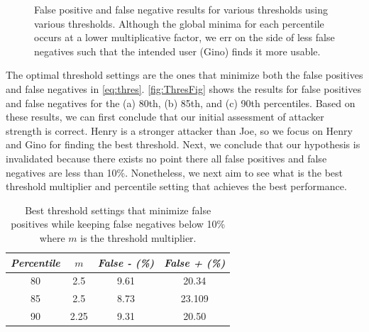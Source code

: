  \begin{figure}[!t]
    	\centering
 	\subfloat[80th Percentile]{
 	\centering
 	\tikzthirds
		
 		 \label{fig:80p}}
 	\subfloat[85th Percentile]{
 	\centering
 	\tikzthirds
		
 		 \label{fig:85p}}
 	\subfloat[90th Percentile]{
 	\centering
 	\tikzthirds
		
 		 \label{fig:90p}}
 	\caption{False positive and false negative results for various thresholds using various thresholds. Although the global minima for each percentile occurs at a lower multiplicative factor, we err on the side of less false negatives such that the intended user (Gino) finds it more usable.}
 	 \label{fig:ThresFig}
 \end{figure}
 
The optimal threshold settings are the ones that minimize both the false positives and false negatives in \autoref{eq:thres}. \autoref{fig:ThresFig} shows the results for false positives and false negatives for the (a) 80th, (b) 85th, and (c) 90th percentiles. Based on these results, we can first conclude that our initial assessment of attacker strength is correct. Henry is a stronger attacker than Joe, so we focus on Henry and Gino for finding the best threshold. Next, we conclude that our hypothesis is invalidated because there exists no point there all false positives and false negatives are less than 10\%. Nonetheless, we next aim to see what is the best threshold multiplier and percentile setting that achieves the best performance. 

\begin{table}[!tb]
\begin{center}
  \begin{tabular}{| c | c | c | c | }
    \hline
    \emph{Percentile} & \emph{$m$} & \emph{False - (\%)} & \emph{False + (\%)}  \\ \hline \hline
    80 & 2.5 & 9.61 & 20.34 	 \\ \hline
    85 & 2.5 & 8.73 & 23.109 	 \\ \hline
    90 & 2.25 & 9.31 & 20.50 	 \\ \hline
  \end{tabular}
\end{center}
\caption{Best threshold settings that minimize false positives while keeping false negatives below 10\% where $m$ is the threshold multiplier.} %
\label{tab:FNFP}
\end{table}

